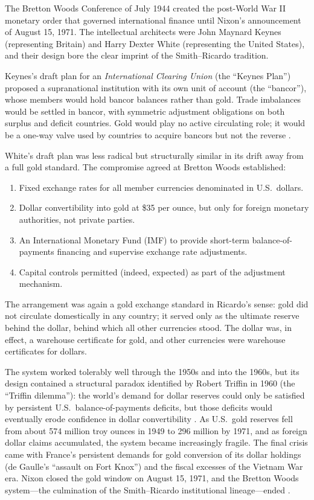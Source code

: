 \documentclass[12pt]{article}
\begin{document}
The Bretton Woods Conference of July 1944 created the post-World
War II monetary order that governed international finance until
Nixon's announcement of August 15, 1971.  The intellectual
architects were John Maynard Keynes (representing Britain) and
Harry Dexter White (representing the United States), and their
design bore the clear imprint of the Smith--Ricardo tradition.

Keynes's draft plan for an \textit{International Clearing Union}
(the ``Keynes Plan'') proposed a supranational institution with
its own unit of account (the ``bancor''), whose members would
hold bancor balances rather than gold.  Trade imbalances would
be settled in bancor, with symmetric adjustment obligations on
both surplus and deficit countries.  Gold would play no active
circulating role; it would be a one-way valve used by countries
to acquire bancors but not the reverse \citep{Keynes1943}.

White's draft plan was less radical but structurally similar
in its drift away from a full gold standard.  The compromise
agreed at Bretton Woods established:

\begin{enumerate}
  \item  Fixed exchange rates for all member currencies denominated
         in U.S.\ dollars.
  \item  Dollar convertibility into gold at \$35 per ounce, but
         only for foreign monetary authorities, not private parties.
  \item  An International Monetary Fund (IMF) to provide short-term
         balance-of-payments financing and supervise exchange
         rate adjustments.
  \item  Capital controls permitted (indeed, expected) as part of
         the adjustment mechanism.
\end{enumerate}

The arrangement was again a gold exchange standard in Ricardo's
sense: gold did not circulate domestically in any country; it served
only as the ultimate reserve behind the dollar, behind which all
other currencies stood.  The dollar was, in effect, a warehouse
certificate for gold, and other currencies were warehouse certificates
for dollars.

The system worked tolerably well through the 1950s and
into the 1960s, but its design contained a structural paradox
identified by Robert Triffin in 1960 (the ``Triffin dilemma''):
the world's demand for dollar reserves could only be satisfied
by persistent U.S.\ balance-of-payments deficits, but those
deficits would eventually erode confidence in dollar
convertibility \citep{Triffin1960}.  As U.S.\ gold reserves
fell from about 574 million troy ounces in 1949 to 296 million
by 1971, and as foreign dollar claims accumulated, the system
became increasingly fragile.  The final crisis came with
France's persistent demands for gold conversion of its dollar
holdings (de Gaulle's ``assault on Fort Knox'') and the
fiscal excesses of the Vietnam War era.  Nixon closed the
gold window on August 15, 1971, and the Bretton Woods
system---the culmination of the Smith--Ricardo institutional
lineage---ended \citep{Eichengreen1996}.
\end{document}
